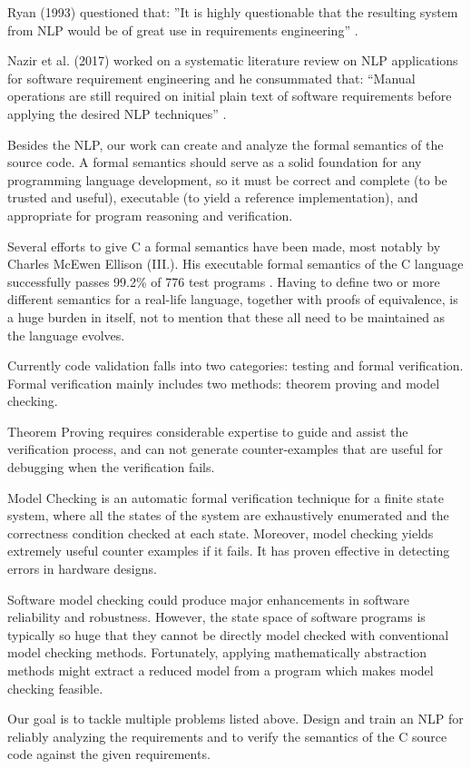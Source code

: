 \begin{multicols*}{2}
	Ryan (1993) questioned that: ”It is highly questionable that the resulting system from \gls{NLP} would be of great use in requirements engineering” \cite{Ryan}.
	
	Nazir et al. (2017) worked on a systematic literature review on \gls{NLP} applications for software requirement engineering and he consummated that: “Manual operations are still required on initial plain text of software requirements before applying the desired \gls{NLP} techniques” \cite{Nazir}.
	
	Besides the \gls{NLP}, our work can create and analyze the formal semantics of the source code.  A formal semantics should serve as a solid foundation for any programming language development, so it must be correct and complete (to be trusted and useful), executable (to yield a reference implementation), and appropriate for program reasoning and verification.
	
	Several efforts to give C a formal semantics have been made, most notably by Charles McEwen Ellison (III.). His executable formal semantics of the C language successfully passes  99.2\% of 776 test programs \cite{Ellison:2012:EFS:2103621.2103719}. Having to define two or more different semantics for a real-life language, together with proofs of equivalence, is a huge burden in itself, not to mention that these all need to be maintained as the language evolves.
	
	Currently code validation falls into two categories: testing and formal verification. Formal verification mainly includes two methods: theorem proving and model checking.
	
	Theorem Proving requires considerable expertise to guide and assist the verification process, and can not generate counter-examples that are useful for debugging when the verification fails.
	
	Model Checking \cite{Clarke:2000:MC:332656} is an automatic formal verification technique for a finite state system, where all the states of the system are exhaustively enumerated and the correctness condition checked at each state. Moreover, model checking yields extremely useful counter examples if it fails. It has proven effective in detecting errors in hardware designs.
	
	Software model checking could produce major enhancements in software reliability and robustness. However, the state space of software programs is typically so huge that they cannot be directly model checked with conventional model checking methods. Fortunately, applying mathematically abstraction methods might extract a reduced model from a program which makes model checking feasible.
	
	Our goal is to tackle multiple problems listed above. Design and train an \gls{NLP} for reliably analyzing the requirements and to verify the semantics of the C source code against the given requirements.
	
\end{multicols*}


